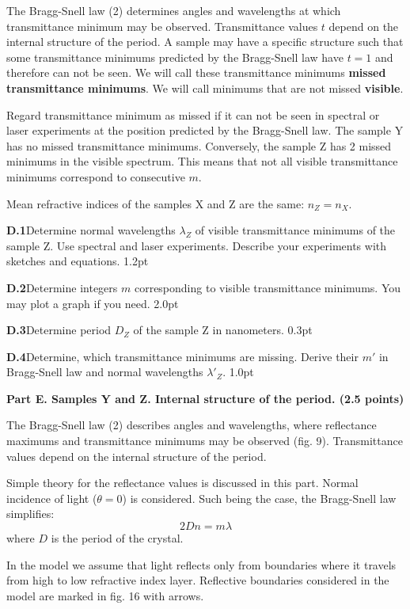 The Bragg-Snell law (2) determines angles and wavelengths at which
transmittance minimum may be observed. Transmittance values $t$ depend on the
internal structure of the period. A sample may have a specific structure such
that some transmittance minimums predicted by the Bragg-Snell law have $t = 1$
and therefore can not be seen. We will call these transmittance minimums
\textbf{missed transmittance minimums}. We will call minimums that are not
missed \textbf{visible}.

Regard transmittance minimum as missed if it can not be seen in spectral or
laser experiments at the position predicted by the Bragg-Snell law. The sample
Y has no missed transmittance minimums. Conversely, the sample Z has 2 missed
minimums in the visible spectrum. This means that not all visible transmittance
minimums correspond to consecutive $m$.

Mean refractive indices of the samples X and Z are the same: $n_Z = n_X$.

\textbf{D.1}\quad Determine normal wavelengths $\lambda_Z$ of visible
transmittance minimums of the sample Z. Use spectral and laser experiments.
Describe your experiments with sketches and equations. \hfill 1.2pt

\textbf{D.2}\quad Determine integers $m$ corresponding to visible transmittance
minimums. You may plot a graph if you need. \hfill 2.0pt

\textbf{D.3}\quad Determine period $D_Z$ of the sample Z in nanometers.
\hfill 0.3pt

\textbf{D.4}\quad Determine, which transmittance minimums are missing. Derive
their $m'$ in Bragg-Snell law and normal wavelengths $\lambda'_Z$.
\hfill 1.0pt

\textbf{Part E. Samples Y and Z. Internal structure of the period. (2.5 points)}

The Bragg-Snell law (2) describes angles and wavelengths, where reflectance
maximums and transmittance minimums may be observed (fig. 9). Transmittance
values depend on the internal structure of the period.

Simple theory for the reflectance values is discussed in this part. Normal
incidence of light ($\theta = 0$) is considered. Such being the case, the
Bragg-Snell law simplifies:
\begin{equation}
2Dn = m\lambda
\tag{7}
\end{equation}
where $D$ is the period of the crystal.

In the model we assume that light reflects only from boundaries where it
travels from high to low refractive index layer. Reflective boundaries
considered in the model are marked in fig. 16 with arrows.

